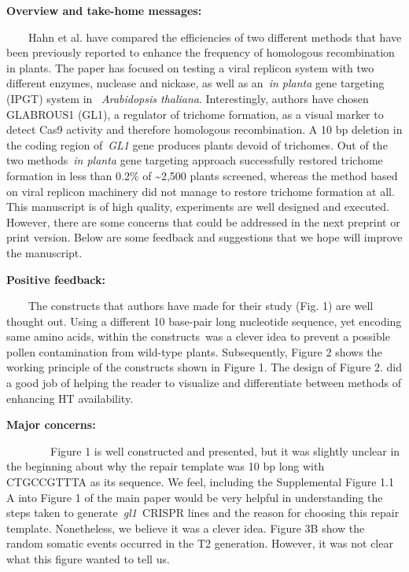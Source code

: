 \documentclass[10pt]{article}
\begin{document}
{\label{463319}}

\textbf{Overview and take-home messages:}

\par\null

~~~~Hahn et al. have compared the efficiencies of two different methods
that have been previously reported to enhance the frequency of
homologous recombination in plants. The paper has focused on testing a
viral replicon system with two different enzymes, nuclease and nickase,
as well as an~\emph{in planta} gene targeting (IPGT) system in~
\emph{Arabidopsis thaliana}. Interestingly, authors have chosen
GLABROUS1 (GL1), a regulator of trichome formation, as a visual marker
to detect Cas9 activity and therefore homologous recombination. A 10 bp
deletion in the coding region of~\emph{GL1} gene produces plants devoid
of trichomes. Out of the two methods~\emph{in planta} gene targeting
approach successfully restored trichome formation in less than 0.2\% of
\textasciitilde{}2,500 plants screened, whereas the method based on
viral replicon machinery did not manage to restore trichome formation at
all. This manuscript is of high quality, experiments are well designed
and executed. However, there are some concerns that could be addressed
in the next preprint or print version. Below are some feedback and
suggestions that we hope will improve the manuscript.

\textbf{Positive feedback:}

\par\null

~~~~The constructs that authors have made for their study (Fig. 1) are
well thought out. Using a different 10 base-pair long nucleotide
sequence, yet encoding same amino acids, within the constructs~was a
clever idea to prevent a possible pollen contamination from wild-type
plants. Subsequently, Figure 2 shows the working principle of the
constructs shown in Figure 1. The design of Figure 2. did a good job of
helping the reader to visualize and differentiate between methods of
enhancing HT availability.~

\textbf{Major concerns:}

\par\null

~~~~~~~~Figure 1 is well constructed and presented, but it was slightly
unclear in the beginning about why the repair template was 10 bp long
with CTGCCGTTTA as its sequence. We feel, including the Supplemental
Figure 1.1 A into Figure 1 of the main paper would be very helpful in
understanding the steps taken to generate~\emph{gl1~}CRISPR lines and
the reason for choosing this repair template. Nonetheless, we believe it
was a clever idea. Figure 3B show the random somatic events occurred in
the T2 generation. However, it was not clear what this figure wanted to
tell us.
\end{document}
